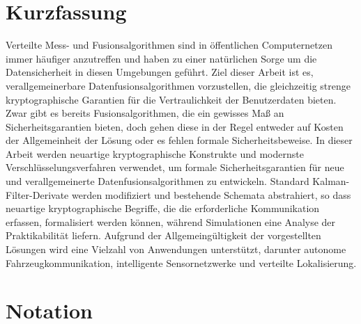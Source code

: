 \documentclass[oneside]{scrbook}
\theoremstyle{definition}
\theoremstyle{definition}
\theoremstyle{remark}
\begin{document}
\chapter{Kurzfassung}
Verteilte Mess- und Fusionsalgorithmen sind in öffentlichen Computernetzen immer häufiger anzutreffen und haben zu einer natürlichen Sorge um die Datensicherheit in diesen Umgebungen geführt. Ziel dieser Arbeit ist es, verallgemeinerbare Datenfusionsalgorithmen vorzustellen, die gleichzeitig strenge kryptographische Garantien für die Vertraulichkeit der Benutzerdaten bieten. Zwar gibt es bereits Fusionsalgorithmen, die ein gewisses Maß an Sicherheitsgarantien bieten, doch gehen diese in der Regel entweder auf Kosten der Allgemeinheit der Lösung oder es fehlen formale Sicherheitsbeweise. In dieser Arbeit werden neuartige kryptographische Konstrukte und modernste Verschlüsselungsverfahren verwendet, um formale Sicherheitsgarantien für neue und verallgemeinerte Datenfusionsalgorithmen zu entwickeln. Standard Kalman-Filter-Derivate werden modifiziert und bestehende Schemata abstrahiert, so dass neuartige kryptographische Begriffe, die die erforderliche Kommunikation erfassen, formalisiert werden können, während Simulationen eine Analyse der Praktikabilität liefern. Aufgrund der Allgemeingültigkeit der vorgestellten Lösungen wird eine Vielzahl von Anwendungen unterstützt, darunter autonome Fahrzeugkommunikation, intelligente Sensornetzwerke und verteilte Lokalisierung.

% 
%                                                                                         
%                                                                                         
%                                                                                         
% 

\chapter{Notation}
\end{document}
